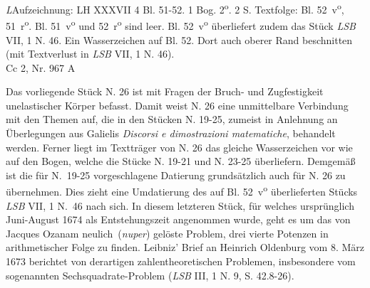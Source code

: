 \begin{Ueberlieferung}%
{\textit{L}}Aufzeichnung: LH XXXVII 4 Bl. 51-52.
1 Bog. 2\textsuperscript{o}.
2 S. Textfolge: Bl. 52~v\textsuperscript{o}, 51~r\textsuperscript{o}.
Bl. 51~v\textsuperscript{o} und 52~r\textsuperscript{o} sind leer.
Bl. 52~v\textsuperscript{o} überliefert zudem das Stück \textit{LSB} VII, 1 N. 46.\cite{01085}
Ein Wasserzeichen auf Bl. 52.
Dort auch oberer Rand beschnitten (mit Textverlust in \textit{LSB} VII, 1 N. 46\cite{01085}).\\%
Cc 2, Nr. 967 A
\end{Ueberlieferung}
\vspace*{8mm}
\begin{Datierungsgruende}%
Das vorliegende Stück N. 26 %
ist mit Fragen der Bruch- und Zugfestigkeit un\-ela\-sti\-scher Körper befasst.
Damit weist N. 26 %
eine unmittelbare Verbindung mit den Themen auf,
die in den Stücken N. 19-25, %
zumeist in Anlehnung an Überlegungen aus Galielis\protect{}
\textit{Discorsi e dimostrazioni matematiche},
behandelt werden.
Ferner liegt im Textträger von N. 26 %
das gleiche Wasserzeichen vor wie auf den Bogen,
welche die Stücke N. 19-21 %
und N. 23-25 %
überliefern. Demgemäß ist die für N.~19-25 %
vorgeschlagene Datierung grundsätzlich auch für N. 26 %
zu übernehmen.
\newline%
\hspace*{7,5mm}%
Dies zieht eine Umdatierung des auf Bl. 52~v\textsuperscript{o} überlieferten Stücks \textit{LSB} VII, 1 N.~46\cite{01085} nach sich.
In diesem letzteren Stück, für welches ursprünglich Juni-August 1674 als Entsteh\-ungszeit angenommen wurde,
geht es um das von Jacques Ozanam\protect{}
\glqq neulich\grqq~(\textit{nuper}) gelöste Problem,
drei vierte Potenzen in arithmetischer Folge zu finden.
Leibniz' Brief an Heinrich Oldenburg\protect{} vom 8. März 1673
berichtet von derartigen zahlentheoretischen Problemen,
insbesondere vom sogenannten Sechsquadrate-Problem (\textit{LSB} III, 1 N. 9, S. 42.8-26\cite{00251}).

\end{Datierungsgruende}
